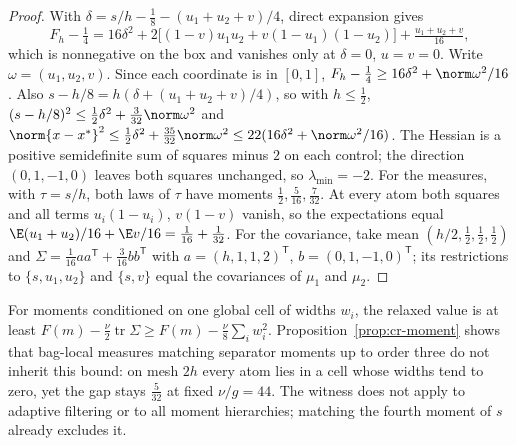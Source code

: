 \begin{proof}
With $\delta=s/h-\frac18-(u_1+u_2+v)/4$, direct expansion gives
\[
F_h-\tfrac14=16\delta^2+2\bigl[(1-v)u_1u_2+v(1-u_1)(1-u_2)\bigr]+\tfrac{u_1+u_2+v}{16},
\]
which is nonnegative on the box and vanishes only at $\delta=0$, $u=v=0$.
Write $\omega=(u_1,u_2,v)$. Since each coordinate is in $[0,1]$,
$F_h-\frac14\ge16\delta^2+\norm\omega^2/16$. Also
$s-h/8=h(\delta+(u_1+u_2+v)/4)$, so with $h\le\frac12$,
$(s-h/8)^2\le\frac12\delta^2+\frac3{32}\norm\omega^2$ and
$\norm{x-x^*}^2\le\frac12\delta^2+\frac{35}{32}\norm\omega^2\le22(16\delta^2+\norm\omega^2/16)$.
The Hessian is a positive semidefinite sum of squares minus $2$ on each
control; the direction $(0,1,-1,0)$ leaves both squares unchanged, so
$\lambda_{\min}=-2$. For the measures, with $\tau=s/h$, both laws of $\tau$ have
moments $\frac12,\frac5{16},\frac7{32}$. At every atom both squares and all
terms $u_i(1-u_i)$, $v(1-v)$ vanish, so the expectations equal
$\E(u_1+u_2)/16+\E v/16=\frac1{16}+\frac1{32}$. For the covariance, take mean
$(h/2,\frac12,\frac12,\frac12)$ and
$\Sigma=\frac1{16}aa^{\mathsf T}+\frac3{16}bb^{\mathsf T}$ with
$a=(h,1,1,2)^{\mathsf T}$, $b=(0,1,-1,0)^{\mathsf T}$; its restrictions to
$\{s,u_1,u_2\}$ and $\{s,v\}$ equal the covariances of $\mu_1$ and $\mu_2$.
\end{proof}

For moments conditioned on one global cell of widths $w_i$, the relaxed value
is at least $F(m)-\frac\nu2\operatorname{tr}\Sigma\ge F(m)-\frac\nu8\sum_iw_i^2$.
Proposition~\ref{prop:cr-moment} shows that bag-local measures matching
separator moments up to order three do not inherit this bound: on mesh $2h$
every atom lies in a cell whose widths tend to zero, yet the gap stays
$\frac5{32}$ at fixed $\nu/g=44$. The witness does not apply to adaptive
filtering or to all moment hierarchies; matching the fourth moment of $s$
already excludes it.
